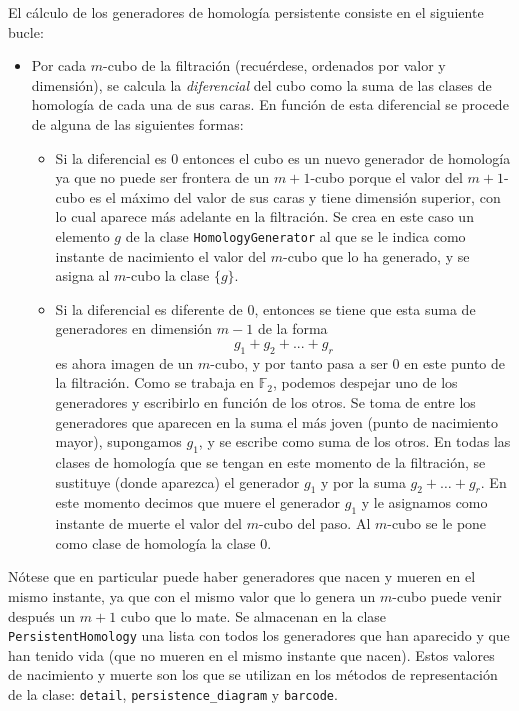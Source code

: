 \documentclass[12pt,a4paper,twoside]{article} %
\theoremstyle{plain}
\theoremstyle{definition}
\newcommand{\F}{\mathbb{F}}
\begin{document}
\begin{enumerate}[(i)]
El cálculo de los generadores de homología persistente consiste en el siguiente bucle:
\begin{itemize}
\item Por cada $m$-cubo de la filtración (recuérdese, ordenados por valor y dimensión), se calcula la \emph{diferencial} del cubo como la suma de las clases de homología de cada una de sus caras. En función de esta diferencial se procede de alguna de las siguientes formas:

\begin{itemize}
\item Si la diferencial es 0 entonces el cubo es un nuevo generador de homología ya que no puede ser frontera de un $m+1$-cubo porque el valor del $m+1$-cubo es el máximo del valor de sus caras y tiene dimensión superior, con lo cual aparece más adelante en la filtración. Se crea en este caso un elemento $g$ de la clase \texttt{HomologyGenerator} al que se le indica como instante de nacimiento el valor del $m$-cubo que lo ha generado, y se asigna al $m$-cubo la clase $\{ g \}$.

\item Si la diferencial es diferente de 0, entonces se tiene que esta suma de generadores en dimensión $m-1$ de la forma
$$ g_1 + g_2 + ... + g_r $$
es ahora imagen de un $m$-cubo, y por tanto pasa a ser 0 en este punto de la filtración. Como se trabaja en $\F_2$, podemos despejar uno de los generadores y escribirlo en función de los otros. Se toma de entre los generadores que aparecen en la suma el más joven (punto de nacimiento mayor), supongamos $g_1$, y se escribe como suma de los otros. En todas las clases de homología que se tengan en este momento de la filtración, se sustituye (donde aparezca) el generador $g_1$ y por la suma $g_2+\dots+g_r$. En este momento decimos que muere el generador $g_1$ y le asignamos como instante de muerte el valor del $m$-cubo del paso. Al $m$-cubo se le pone como clase de homología la clase 0.
\end{itemize}
\end{itemize}

Nótese que en particular puede haber generadores que nacen y mueren en el mismo instante, ya que con el mismo valor que lo genera un $m$-cubo puede venir después un $m+1$ cubo que lo mate. Se almacenan en la clase \texttt{PersistentHomology} una lista con todos los generadores que han aparecido y que han tenido vida (que no mueren en el mismo instante que nacen). Estos valores de nacimiento y muerte son los que se utilizan en los métodos de representación de la clase: \texttt{detail}, \texttt{persistence\_diagram} y \texttt{barcode}.

\end{enumerate}
\end{document}
